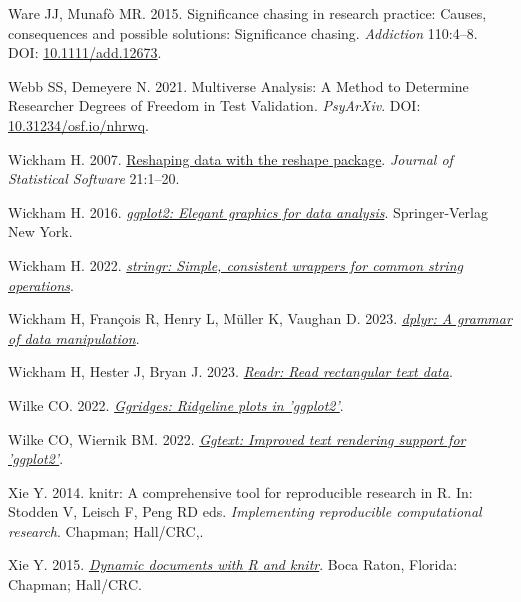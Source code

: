 \documentclass[10pt,a4paper]{article}
\newlength{\cslhangindent}
\newenvironment{CSLReferences}[2] %
 {\begin{list}{}{%
  \setlength{\itemindent}{0pt}
  \setlength{\leftmargin}{0pt}
  \setlength{\parsep}{0pt}
  \ifodd #1
   \setlength{\leftmargin}{\cslhangindent}
   \setlength{\itemindent}{-1\cslhangindent}
  \fi
  \setlength{\itemsep}{#2\baselineskip}}}
 {\end{list}}
\begin{document}
\begin{CSLReferences}{1}{0}
Ware JJ, Munafò MR. 2015. Significance chasing in research practice: Causes, consequences and possible solutions: {Significance} chasing. \emph{Addiction} 110:4--8. DOI: \href{https://doi.org/10.1111/add.12673}{10.1111/add.12673}.

Webb SS, Demeyere N. 2021. Multiverse {Analysis}: {A} {Method} to {Determine} {Researcher} {Degrees} of {Freedom} in {Test} {Validation}. \emph{PsyArXiv}. DOI: \href{https://doi.org/10.31234/osf.io/nhrwq}{10.31234/osf.io/nhrwq}.

Wickham H. 2007. \href{http://www.jstatsoft.org/v21/i12/}{Reshaping data with the {reshape} package}. \emph{Journal of Statistical Software} 21:1--20.

Wickham H. 2016. \emph{\href{https://ggplot2.tidyverse.org}{ggplot2: Elegant graphics for data analysis}}. Springer-Verlag New York.

Wickham H. 2022. \emph{\href{https://CRAN.R-project.org/package=stringr}{{stringr}: Simple, consistent wrappers for common string operations}}.

Wickham H, François R, Henry L, Müller K, Vaughan D. 2023. \emph{\href{https://CRAN.R-project.org/package=dplyr}{{dplyr}: A grammar of data manipulation}}.

Wickham H, Hester J, Bryan J. 2023. \emph{\href{https://CRAN.R-project.org/package=readr}{Readr: Read rectangular text data}}.

Wilke CO. 2022. \emph{\href{https://CRAN.R-project.org/package=ggridges}{Ggridges: Ridgeline plots in 'ggplot2'}}.

Wilke CO, Wiernik BM. 2022. \emph{\href{https://CRAN.R-project.org/package=ggtext}{Ggtext: Improved text rendering support for 'ggplot2'}}.

Xie Y. 2014. {knitr}: A comprehensive tool for reproducible research in {R}. In: Stodden V, Leisch F, Peng RD eds. \emph{Implementing reproducible computational research}. Chapman; Hall/CRC,.

Xie Y. 2015. \emph{\href{https://yihui.org/knitr/}{Dynamic documents with {R} and knitr}}. Boca Raton, Florida: Chapman; Hall/CRC.


\end{CSLReferences}
\end{document}
